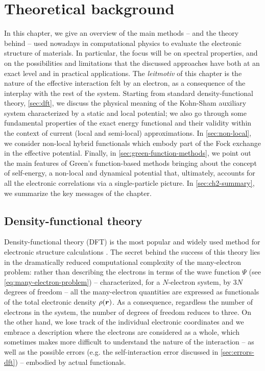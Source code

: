 \cleardoublepage
\chapter{Theoretical background\label{ch:theoretical-background}}

In this chapter, we give an overview of the main methods -- and the theory behind -- used nowadays in computational physics to evaluate the electronic structure of materials. In particular, the focus will be on spectral properties, and on the possibilities and limitations that the discussed approaches have both at an exact level and in practical applications. The \emph{leitmotiv} of this chapter is the nature of the effective interaction felt by an electron, as a consequence of the interplay with the rest of the system. Starting from standard density-functional theory, \cref{sec:dft}, we discuss the physical meaning of the Kohn-Sham auxiliary system characterized by a static and local potential; we also go through some fundamental properties of the exact energy functional and their validity within the context of current (local and semi-local) approximations. In \cref{sec:non-local}, we consider non-local hybrid functionals which embody part of the Fock exchange in the effective potential. Finally, in \cref{sec:green-function-methods}, we point out the main features of Green's function-based methods bringing about the concept of self-energy, a non-local and dynamical potential that, ultimately, accounts for all the electronic correlations via a single-particle picture. In \cref{sec:ch2-summary}, we summarize the key messages of the chapter.

\clearpage
\section{Density-functional theory\label{sec:dft}}
Density-functional theory (DFT) is the most popular and widely used method for electronic structure calculations \cite{van_noorden_top_2014}. The secret behind the success of this theory lies in the dramatically reduced computational complexity of the many-electron problem: rather than describing the electrons in terms of the wave function $\Psi$ (see \cref{eq:many-electron-problem}) -- characterized, for a $N$-electron system, by $3N$ degrees of freedom -- all the many-electron quantities are expressed as functionals of the total electronic density $\rho({\bm r})$. As a consequence, regardless the number of electrons in the system, the number of degrees of freedom reduces to three. On the other hand, we lose track of the individual electronic coordinates and we embrace a description where the electrons are considered as a whole, which sometimes makes more difficult to understand the nature of the interaction -- as well as the possible errors (e.g. the self-interaction error discussed in \cref{sec:errors-dft}) -- embodied by actual functionals.

